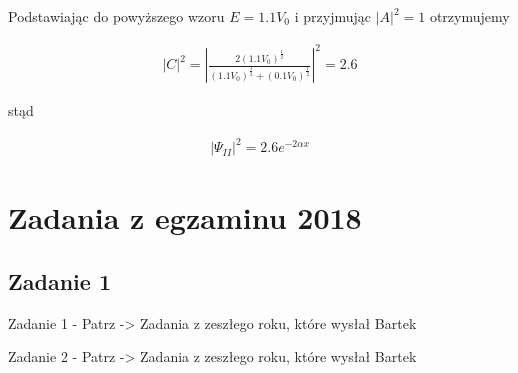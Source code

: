 \documentclass[a4paper,15pt]{article}
\newcommand{\issue}[2]{
    \begin{tcolorbox}[colback=issueColor!5!white,colframe=issueColor,title={Zagadnienie #1}]
        #2
    \end{tcolorbox}
}
\begin{document}
Podstawiając do powyższego wzoru $E=1.1V_0$ i przyjmując $|A|^2 = 1$ otrzymujemy

\begin{align*}
|C|^2 = |\frac{2(1.1V_0)^\frac{1}{2}}{(1.1V_0)^\frac{1}{2} + (0.1V_0)^\frac{1}{2}}|^2 = 2.6
\end{align*}


stąd

\begin{align*}
|\Psi _{II}|^2 = 2.6e^{-2\alpha x}
\end{align*}













\newpage
\section{Zadania z egzaminu 2018}

\subsection{Zadanie 1}

\issue{}{
Zadanie 1 - Patrz -> Zadania z zeszłego roku, które wysłał Bartek
}

\issue{}{
Zadanie 2 - Patrz -> Zadania z zeszłego roku, które wysłał Bartek
}
\end{document}
